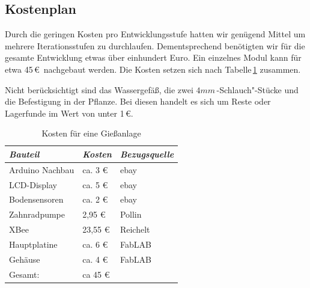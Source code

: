 \subsection{Kostenplan}
 Durch die geringen Kosten pro Entwicklungsstufe hatten wir genügend Mittel um mehrere Iterationsstufen  zu durchlaufen.
 Dementsprechend benötigten wir für die gesamte Entwicklung etwas über einhundert Euro.
 Ein einzelnes Modul kann für etwa 45\,\euro\ nachgebaut werden. 
 Die Kosten setzen sich nach Tabelle\,\ref{Kosten für eine Giessanlage} zusammen.
 
 Nicht berücksichtigt sind das Wassergefäß, die zwei \begin{math}4mm\end{math}\,-Schlauch"-Stücke und die Befestigung in der Pflanze.
 Bei diesen handelt es sich um Reste oder Lagerfunde im Wert von unter 1\,\euro. 
 
\begin{table}[ht]
	\centering
	\onehalfspacing
	\footnotesize
	\caption{Kosten für eine Gießanlage}
	\label{Kosten für eine Giessanlage}
		\begin{tabular}{|l|ll|}
			\hline
\textit{Bauteil} & \textit{Kosten} & \textit{Bezugsquelle} \\
\hline
Arduino Nachbau & ca. 3 \euro & ebay \\
LCD-Display & ca. 5 \euro & ebay\\
Bodensensoren & ca. 2 \euro & ebay \\
Zahnradpumpe & 2,95 \euro & Pollin \\
XBee &  23,55 \euro & Reichelt \\
Hauptplatine & ca. 6 \euro & FabLAB \\
Gehäuse	& ca. 4 \euro & FabLAB \\

\hline
Gesamt: & ca 45 \euro & \\
\hline
\end{tabular}
\end{table}
